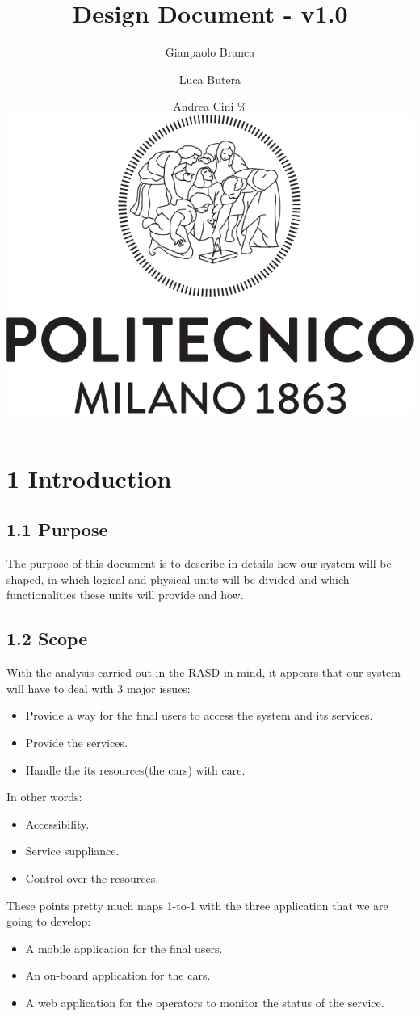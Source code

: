 \documentclass[]{article}
\title{\textbf{Design Document - v1.0}}
\author{Gianpaolo Branca \and Luca Butera \and Andrea Cini\newline
 \%\includegraphics{polimi.png}}
\date{}
\providecommand{\tightlist}{%
  \setlength{\itemsep}{0pt}\setlength{\parskip}{0pt}}
\begin{document}
\maketitle

{
\setcounter{tocdepth}{6}
\tableofcontents
}
\newpage

\section{1 Introduction}\label{introduction}

\subsection{1.1 Purpose}\label{purpose}

The purpose of this document is to describe in details how our system
will be shaped, in which logical and physical units will be divided and
which functionalities these units will provide and how.

\subsection{1.2 Scope}\label{scope}

With the analysis carried out in the RASD in mind, it appears that our
system will have to deal with 3 major issues:

\begin{itemize}
\tightlist
\item
  Provide a way for the final users to access the system and its
  services.
\item
  Provide the services.
\item
  Handle the its resources(the cars) with care.
\end{itemize}

In other words:

\begin{itemize}
\tightlist
\item
  Accessibility.
\item
  Service suppliance.
\item
  Control over the resources.
\end{itemize}

These points pretty much maps 1-to-1 with the three application that we
are going to develop:

\begin{itemize}
\tightlist
\item
  A mobile application for the final users.
\item
  An on-board application for the cars.
\item
  A web application for the operators to monitor the status of the
  service.
\end{itemize}
\end{document}
